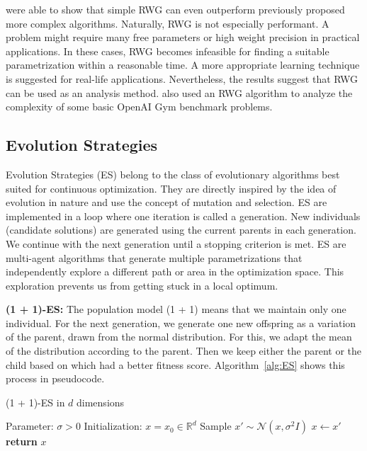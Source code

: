 \cite{schmidhuber2001evaluating} were able to show that simple RWG can even outperform previously proposed more complex algorithms. Naturally, RWG is not especially performant. A problem might require many free parameters or high weight precision in practical applications. In these cases, RWG becomes infeasible for finding a suitable parametrization within a reasonable time. A more appropriate learning technique is suggested for real-life applications. Nevertheless, the results suggest that RWG can be used as an analysis method. \cite{oller_analyzing_2020} also used an RWG algorithm to analyze the complexity of some basic OpenAI Gym benchmark problems.

\subsection{Evolution Strategies}
Evolution Strategies (ES) belong to the class of evolutionary algorithms best suited for continuous optimization. They are directly inspired by the idea of evolution in nature and use the concept of mutation and selection. ES are implemented in a loop where one iteration is called a generation. New individuals (candidate solutions) are generated using the current parents in each generation. We continue with the next generation until a stopping criterion is met. ES are multi-agent algorithms that generate multiple parametrizations that independently explore a different path or area in the optimization space. This exploration prevents us from getting stuck in a local optimum.

\textbf{(1 + 1)-ES:} The population model (1 + 1) means that we maintain only one individual. For the next generation, we generate one new offspring as a variation of the parent, drawn from the normal distribution. For this, we adapt the mean of the distribution according to the parent. Then we keep either the parent or the child based on which had a better fitness score. Algorithm~\ref{alg:ES} shows this process in pseudocode.
\begin{algorithm}
\caption{(1 + 1)-ES in $d$ dimensions}
\begin{algorithmic}[1]
\State Parameter: $\sigma > 0$
\State Initialization: $x = x_0 \in \mathbb{R}^d$
    \State Sample $x' \sim \mathcal{N}(x, \sigma^2 I)$
      \State $x \leftarrow x'$
    \EndIf
\EndWhile
\State \textbf{return} $x$
\end{algorithmic}
\label{alg:ES}
\end{algorithm}

